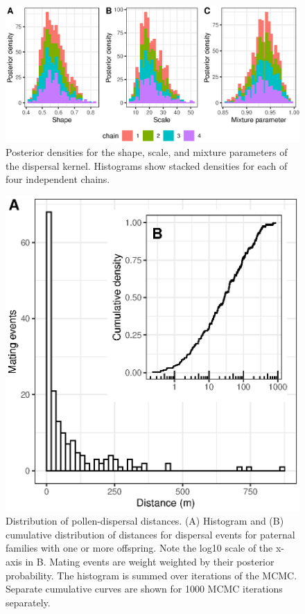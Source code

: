 \documentclass[10pt, a4paper, twocolumn]{article} %
\begin{document}
\begin{figure}
    \centering
    \includegraphics{fig-posterior_distributions.eps}
    \caption{
        Posterior densities for the shape, scale, and mixture parameters of the dispersal kernel.
        Histograms show stacked densities for each of four independent chains.
    }
    \label{fig:posterior_summaries}
\end{figure}

\begin{figure}
    \centering
    \includegraphics{fig-dispersal.eps}
    \caption{
        Distribution of pollen-dispersal distances.
        (A) Histogram and (B) cumulative distribution of distances for dispersal events for paternal families with one or more offspring.
        Note the log10 scale of the x-axis in B.
        Mating events are weight weighted by their posterior probability.
        The histogram is summed over iterations of the MCMC.
        Separate cumulative curves are shown for 1000 MCMC iterations separately.
    }
    \label{fig:dispersal}
\end{figure}
\end{document}
